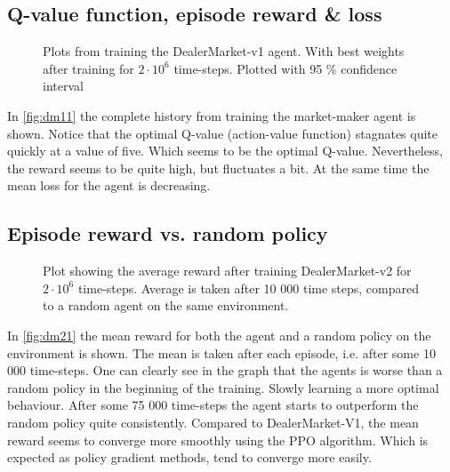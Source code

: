 \documentclass{kththesis}
\theoremstyle{definition}
\begin{document}
\subsection*{Q-value function, episode reward \& loss}
\begin{figure}[H]
	    	\centering
		
		\caption{Plots from training the DealerMarket-v1 agent. With best weights after training for $2\cdot 10^{6}$ time-steps. Plotted with 95 \% confidence interval}
		\label{fig:dm11}
\end{figure}
In \autoref{fig:dm11} the complete history from training the market-maker agent is shown. Notice that the optimal Q-value (action-value function) stagnates quite quickly at a value of five. Which seems to be the optimal Q-value. Nevertheless, the reward seems to be quite high, but fluctuates a bit. At the same time the mean loss for the agent is decreasing.

\subsection*{Episode reward vs. random policy}
\begin{figure}[H]
	    	\centering
		
		\caption{Plot showing the average reward after training DealerMarket-v2 for $2\cdot 10^{6}$ time-steps. Average is taken after 10 000 time steps, compared to a random agent on the same environment.}
		\label{fig:dm21}
\end{figure}
In \autoref{fig:dm21} the mean reward for both the agent and a random policy on the environment is shown. The mean is taken after each episode, i.e. after some 10 000 time-steps. One can clearly see in the graph that the agents is worse than a random policy in the beginning of the training. Slowly learning a more optimal behaviour. After some 75 000 time-steps the agent starts to outperform the random policy quite consistently. Compared to DealerMarket-V1, the mean reward seems to converge more smoothly using the PPO algorithm. Which is expected as policy gradient methods, tend to converge more easily.
\end{document}
